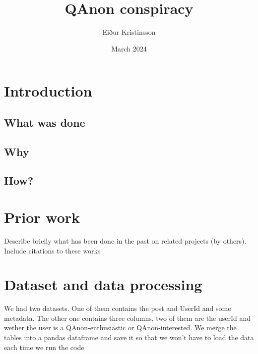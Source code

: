 \documentclass{article}
\title{QAnon conspiracy}
\author{Eiður Kristinsson}
\date{March 2024}
\begin{document}
\maketitle
\tableofcontents

\newpage
\section{Introduction}
\subsection{What was done}
\subsection{Why}
\subsection{How?}

\section{Prior work}

Describe briefly what has been done in the past on related projects (by others).
Include citations to these works

\section{Dataset and data processing}
We had two datasets. One of them contains the post and UserId and some metadata. The other one contains three columns, two of them are the userId and wether the user is a QAnon-enthusiastic or QAnon-interested. 
We merge the tables into a pandas dataframe and save it so that we won't have to load the data each time we run the code
\end{document}
